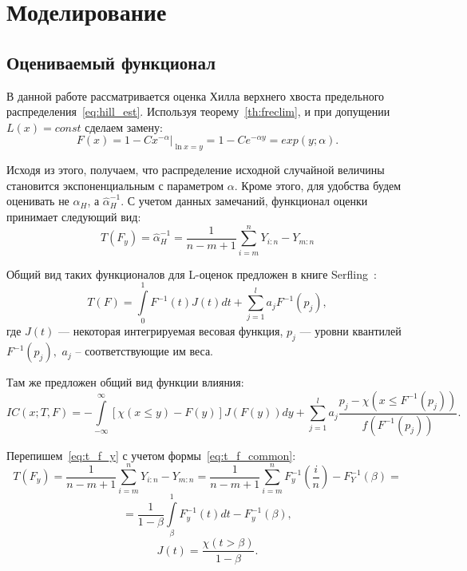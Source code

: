 \documentclass[12pt, specialist, subf, substylefile = spbu.rtx]{disser}
\begin{document}
\chapter{Моделирование}

\section{Оцениваемый функционал}

В данной работе рассматривается оценка Хилла верхнего хвоста предельного распределения~\eqref{eq:hill_est}. Используя теорему~\ref{th:freclim}, и при допущении $L(x)=const$ сделаем замену:
\begin{equation}\label{eq:rep_xy}
F(x)=1-Cx^{-\alpha}|_{\ln x=y}=1-Ce^{-\alpha y}=exp(y; \alpha).
\end{equation}

Исходя из этого, получаем, что распределение исходной случайной величины становится экспоненциальным с параметром $\alpha$. Кроме этого, для удобства будем оценивать не $\hat{\alpha}_H$, а $\hat{\alpha}_H^{-1}$. С учетом данных замечаний, функционал оценки принимает следующий вид:
\begin{equation}\label{eq:t_f_y}
T(F_y)=\hat{\alpha}_H^{-1}=\frac{1}{n-m+1} \sum\limits_{i=m}^n Y_{i:n}- Y_{m:n}
\end{equation}


Общий вид таких функционалов для L-оценок предложен в книге Serfling~\cite[стр.~263]{Serfling}:
\begin{equation}\label{eq:t_f_common}
T(F)=\int\limits_0^1 F^{-1}(t)J(t)dt + \sum\limits_{j=1}^l a_jF^{-1}(p_j),
\end{equation}
где $J(t)$ --- некоторая интегрируемая весовая функция, $p_j$ --- уровни квантилей $F^{-1}(p_j),$ $a_j$ -- соответствующие им веса. 

Там же предложен общий вид функции влияния:
$$
IC(x; T, F)=-\int\limits_{-\infty}^\infty [\chi(x \le y) - F(y)]J(F(y))dy+ \sum\limits_{j=1}^l a_j\frac{p_j-\chi(x \le F^{-1}(p_j))}{f(F^{-1}(p_j))}.
$$

Перепишем~\eqref{eq:t_f_y} с учетом формы~\eqref{eq:t_f_common}:
$$
T(F_y)=\frac{1}{n-m+1} \sum\limits_{i=m}^n Y_{i:n}-Y_{m:n}=
\frac{1}{n-m+1} \sum\limits_{i=m}^n F_y^{-1}(\frac{i}{n})-F_Y^{-1}(\beta)=
$$
\begin{equation}\label{eq:t_hill_res}
=\frac{1}{1-\beta} \int\limits_\beta^1 F_y^{-1}(t) dt-F_y^{-1}(\beta),
\end{equation}
\begin{equation}\label{eq:jt}
J(t)=\frac{\chi(t>\beta)}{1-\beta}.
\end{equation}
\end{document}
